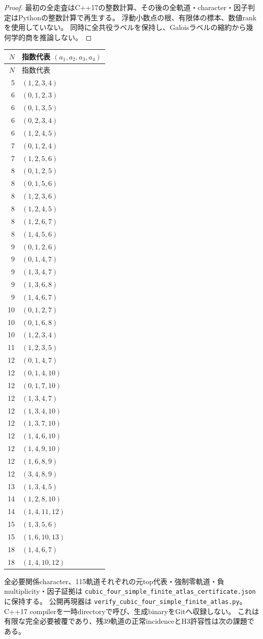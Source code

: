 \begin{proof}
最初の全走査はC++17の整数計算、その後の全軌道・character・因子判定はPythonの整数計算で再生する。
浮動小数点の根、有限体の標本、数値rankを使用していない。
同時に全共役ラベルを保持し、Galoisラベルの縮約から幾何学的商を推論しない。
\end{proof}

\begin{center}
\begin{longtable}{r l}
\toprule
 $N$&指数代表 $(a_1,a_2,a_3,a_4)$\\
\midrule
\endfirsthead
\toprule $N$&指数代表\\\midrule
\endhead
5&$(1,2,3,4)$\\
6&$(0,1,2,3)$\\
6&$(0,1,3,5)$\\
6&$(0,2,3,4)$\\
6&$(1,2,4,5)$\\
7&$(0,1,2,4)$\\
7&$(1,2,5,6)$\\
8&$(0,1,2,5)$\\
8&$(0,1,5,6)$\\
8&$(1,2,3,6)$\\
8&$(1,2,4,5)$\\
8&$(1,2,6,7)$\\
8&$(1,4,5,6)$\\
9&$(0,1,2,6)$\\
9&$(0,1,4,7)$\\
9&$(1,3,4,7)$\\
9&$(1,3,6,8)$\\
9&$(1,4,6,7)$\\
10&$(0,1,2,7)$\\
10&$(0,1,6,8)$\\
10&$(1,2,3,4)$\\
11&$(1,2,3,5)$\\
12&$(0,1,4,7)$\\
12&$(0,1,4,10)$\\
12&$(0,1,7,10)$\\
12&$(1,3,4,7)$\\
12&$(1,3,4,10)$\\
12&$(1,3,7,10)$\\
12&$(1,4,6,10)$\\
12&$(1,4,9,10)$\\
12&$(1,6,8,9)$\\
12&$(3,4,8,9)$\\
13&$(1,3,4,5)$\\
14&$(1,2,8,10)$\\
14&$(1,4,11,12)$\\
15&$(1,3,5,6)$\\
15&$(1,6,10,13)$\\
18&$(1,4,6,7)$\\
18&$(1,4,10,12)$\\
\bottomrule
\end{longtable}
\end{center}

全必要関係character、115軌道それぞれの元top代表・強制零軌道・負multiplicity・因子証拠は
\texttt{cubic\_four\_simple\_finite\_atlas\_certificate.json} に保持する。
公開再現器は \texttt{verify\_cubic\_four\_simple\_finite\_atlas.py}。
C++17 compilerを一時directoryで呼び、生成binaryをGitへ収録しない。
これは有限な完全必要被覆であり、残39軌道の正常incidenceとH3許容性は次の課題である。
